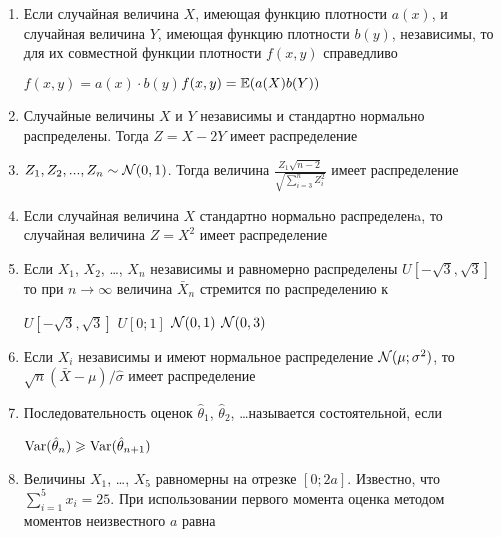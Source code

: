 \begin{enumerate}
\item Если случайная величина $X$, имеющая функцию плотности $a(x)$, и случайная величина $Y$, имеющая функцию плотности $b(y)$, независимы, то для их совместной функции плотности  $f(x,y)$ справедливо

{$f(x,y)=a(x)\cdot b(y)$}{$f(x,y)=\mathbb{E}(a(X)b(Y))$}


\item Случайные величины $X$ и $Y$ независимы и стандартно нормально распределены. Тогда $Z=X-2Y$ имеет распределение


\item $Z_1,Z_2,...,Z_n\sim \mathcal{N}(0,1)$. Тогда величина $\frac{Z_1\sqrt{n-2}}{\sqrt{\sum_{i=3}^n Z_i^2}}$ имеет распределение


\item Если случайная величина $X$ стандартно нормально распределенa, то случайная величина $Z=X^2$ имеет распределение


\item Если $X_1$, $X_2$, \ldots, $X_n$ независимы и равномерно распределены $U[-\sqrt{3},\sqrt{3}]$  то при $n\to\infty$ величина $\bar{X}_n$ стремится по распределению к


{$U[-\sqrt{3},\sqrt{3}]$}
{$U[0;1]$}
{$\mathcal{N}(0,1)$}
{$\mathcal{N}(0,3)$}

\item Если $X_i$ независимы и имеют нормальное распределение $\mathcal{N}(\mu;\sigma^2)$, то $\sqrt{n}(\bar{X}-\mu)/\hat{\sigma}$ имеет распределение


\item Последовательность оценок $\hat{\theta}_1$, $\hat{\theta}_2$, \ldots называется состоятельной, если

{$\operatorname{Var}(\hat{\theta}_n)\geqslant \operatorname{Var}(\hat{\theta}_{n+1})$}

\item Величины $X_1$, \ldots, $X_5$ равномерны на отрезке $[0;2a]$. Известно, что $\sum_{i=1}^5 x_i=25$. При использовании первого момента оценка методом моментов неизвестного $a$ равна


\end{enumerate}
